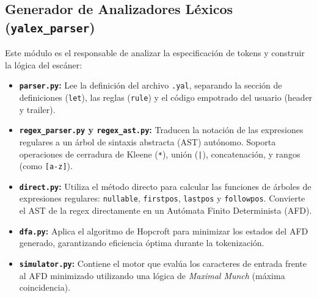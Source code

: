 \documentclass[12pt,letterpaper]{article}
\begin{document}
\subsection{Generador de Analizadores Léxicos (\texttt{yalex\_parser})}
Este módulo es el responsable de analizar la especificación de tokens y construir la lógica del escáner:
\begin{itemize}
    \item \textbf{\texttt{parser.py}:} Lee la definición del archivo \texttt{.yal}, separando la sección de definiciones (\texttt{let}), las reglas (\texttt{rule}) y el código empotrado del usuario (header y trailer).
    \item \textbf{\texttt{regex\_parser.py} y \texttt{regex\_ast.py}:} Traducen la notación de las expresiones regulares a un árbol de sintaxis abstracta (AST) autónomo. Soporta operaciones de cerradura de Kleene (\texttt{*}), unión (\texttt{|}), concatenación, y rangos (como \texttt{[a-z]}).
    \item \textbf{\texttt{direct.py}:} Utiliza el método directo para calcular las funciones de árboles de expresiones regulares: \texttt{nullable}, \texttt{firstpos}, \texttt{lastpos} y \texttt{followpos}. Convierte el AST de la regex directamente en un Autómata Finito Determinista (AFD).
    \item \textbf{\texttt{dfa.py}:} Aplica el algoritmo de Hopcroft para minimizar los estados del AFD generado, garantizando eficiencia óptima durante la tokenización.
    \item \textbf{\texttt{simulator.py}:} Contiene el motor que evalúa los caracteres de entrada frente al AFD minimizado utilizando una lógica de \textit{Maximal Munch} (máxima coincidencia).
\end{itemize}
\end{document}
